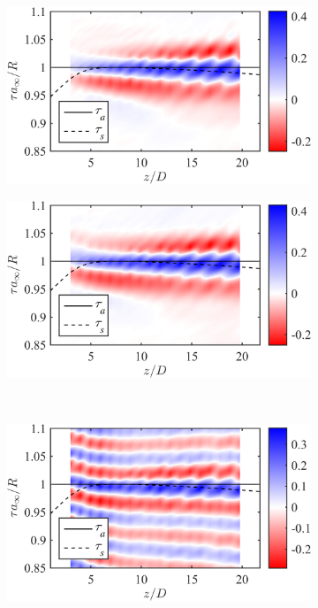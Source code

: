 \begin{figure}
	\centering
	\begin{subfigure}{.5\textwidth}
		\centering
		\includegraphics[width=0.95\linewidth]{Figures/ch3_St000_r120_ff30xcor_oa.png}
		\caption{}
		\label{fig:ch3_xcorrOA_St000}
	\end{subfigure}%
	\begin{subfigure}{.5\textwidth}
		\centering
		\includegraphics[width=0.95\linewidth]{Figures/ch3_St005_r120_ff30xcor_oa.png}
		\caption{}
		\label{fig:ch3_xcorrOA_St005}
	\end{subfigure}\\
	\begin{subfigure}{.5\textwidth}
		\centering
		\includegraphics[width=0.95\linewidth]{Figures/ch3_St025_r120_ff30xcor_oa.png}

\end{subfigure}
\end{figure}
